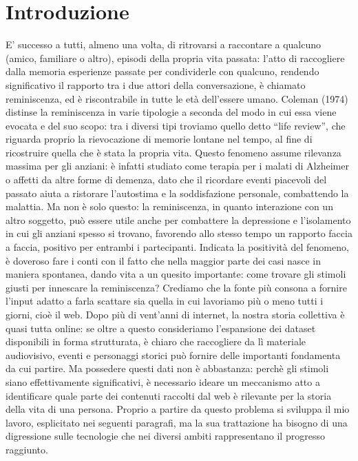\documentclass[sigproc-sp.tex]{subfiles}
\begin{document}
\section{Introduzione}
E’ successo a tutti, almeno una volta, di ritrovarsi a raccontare a qualcuno (amico, familiare o altro), episodi della propria vita passata: l’atto di raccogliere dalla memoria esperienze passate per condividerle con qualcuno, rendendo significativo il rapporto tra i due attori della conversazione, è chiamato reminiscenza, ed è riscontrabile in tutte le età dell’essere umano. Coleman (1974) distinse la reminiscenza in varie tipologie a seconda del modo in cui essa viene evocata e del suo scopo: tra i diversi tipi troviamo quello detto “life review”, che riguarda proprio la rievocazione di memorie lontane nel tempo, al fine di ricostruire quella che è stata la propria vita. Questo fenomeno assume rilevanza massima per gli anziani: è infatti studiato come terapia per i malati di Alzheimer o affetti da altre forme di demenza, dato che il ricordare eventi piacevoli del passato aiuta a ristorare l’autostima e la soddisfazione personale, combattendo la malattia. Ma non è solo questo: la reminiscenza, in quanto interazione con un altro soggetto, può essere utile anche per combattere la depressione e l’isolamento in cui gli anziani spesso si trovano, favorendo allo stesso tempo un rapporto faccia a faccia, positivo per entrambi i partecipanti.
Indicata la positività del fenomeno, è doveroso fare i conti con il fatto che nella maggior parte dei casi nasce in maniera spontanea, dando vita a un quesito importante: come trovare gli stimoli giusti per innescare la reminiscenza? Crediamo che la fonte più consona a fornire l’input adatto a farla scattare sia quella in cui lavoriamo più o meno tutti i giorni, cioè il web. Dopo più di vent’anni di internet, la nostra storia collettiva è quasi tutta online: se oltre a questo consideriamo l’espansione dei dataset disponibili in forma strutturata, è chiaro che raccogliere da lì materiale audiovisivo, eventi e personaggi storici può fornire delle importanti fondamenta da cui partire.
Ma possedere questi dati non è abbastanza: perchè gli stimoli siano effettivamente significativi, è necessario ideare un meccanismo atto a identificare quale parte dei contenuti raccolti dal web è rilevante per la storia della vita di una persona. Proprio a partire da questo problema si sviluppa il mio lavoro, esplicitato nei seguenti paragrafi, ma la sua trattazione ha bisogno di una digressione sulle tecnologie che nei diversi ambiti rappresentano il progresso raggiunto.
\vspace*{1\baselineskip}
\end{document}
